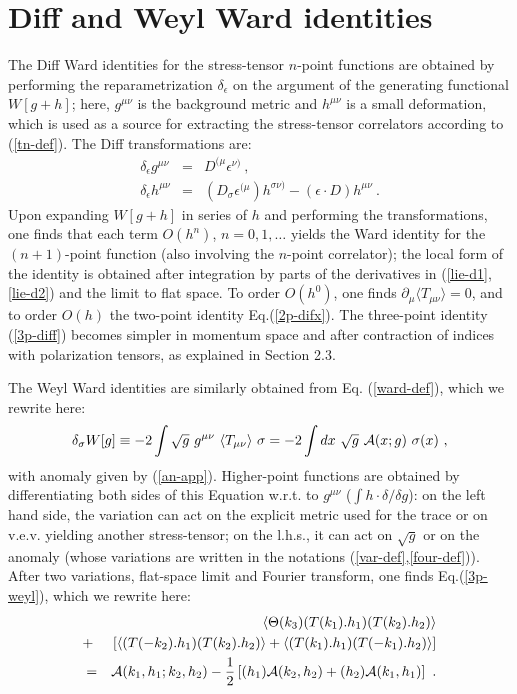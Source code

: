 \documentclass[11pt]{article}
\newcommand{\beq}{\begin{equation}}
\newcommand{\eeq}{\end{equation}}
\newcommand{\bea}{\begin{eqnarray}}
\newcommand{\eea}{\end{eqnarray}}
\def\s{\sigma}
\def\d{\delta}
\def\eps{\epsilon}
\def\T{\Theta}
\def\half{{1 \over 2}}
\def\nl{\nonumber\\}
\def\bh{\!\!\!\!\!\!}
\def\bra{\langle}
\def\ket{\rangle}
\def\A{{\cal A}}    %
\begin{document}


\section{Diff and Weyl Ward identities} 
\label{app-ward}

The Diff Ward identities for the stress-tensor $n$-point functions
are obtained by performing the reparametrization 
$\d_\eps$ on the argument of the generating functional
$W[g+h]$; here, $g^{\mu\nu}$ is the background metric and 
$h^{\mu\nu}$ is a small deformation, which is used as a source
for extracting the stress-tensor correlators according to (\ref{tn-def}).
The Diff transformations are:
\bea
\delta_\eps g^{\mu\nu} &=& D^{(\mu} \eps^{\nu)}\ ,
\label{lie-d1}\\
\delta_\eps h^{\mu\nu} &=& \left( D_\s \eps^{(\mu} \right)
h^{\s\nu)} - \left( \eps\cdot D\right) h^{\mu\nu}\ .
\label{lie-d2} 
\eea
Upon expanding $W[g+h]$ in series of $h$ and performing the
transformations, one finds that each term $O(h^n)$, $n=0,1,\dots$ yields
the Ward identity for the $(n+1)$-point function (also involving
the $n$-point correlator); the local form of the
identity is obtained after integration by parts of 
the derivatives in (\ref{lie-d1},\ref{lie-d2})
and the limit to flat space.
To order $O(h^0)$, one finds $\partial_\mu \bra T_{\mu\nu} \ket =0$,
and to order $O(h)$ the two-point identity Eq.(\ref{2p-difx}).
The three-point identity (\ref{3p-diff}) becomes simpler
in momentum space and after contraction
of indices with polarization tensors, as explained in Section 2.3.

The Weyl Ward identities are similarly obtained from 
Eq. (\ref{ward-def}), which we rewrite here:
\beq
\d_\s W[g] \equiv -2 \int \sqrt{g}\ g^{\mu\nu}\ \bra T_{\mu\nu}\ket\ \sigma 
= -2 \int dx\ \sqrt{g}\  {\cal A}(x;g)\ \sigma(x)\ ,
\label{weyl-def}\eeq
with anomaly given by (\ref{an-app}).
Higher-point functions are obtained by differentiating both sides of 
this Equation w.r.t. to $g^{\mu\nu}$
($\int h \cdot \d/\d g$): on the left hand side, the variation can act on 
the explicit metric used for the trace or on v.e.v. yielding another
stress-tensor; on the
l.h.s., it can act on $\sqrt{g}$ or on the anomaly 
(whose variations are written in the notations 
(\ref{var-def},\ref{four-def})).
After two variations, flat-space limit and Fourier transform, one finds 
Eq.(\ref{3p-weyl}), which we rewrite here:
\bea\label{3p-wey} 
&&\bh\bh \bra \T(k_3)(T(k_1).h_1)(T(k_2).h_2) \ket \nl 
&+& \left[ \bra (T(-k_2).h_1)(T(k_2).h_2) \ket + 
                     \bra (T(k_1).h_1)(T(-k_1).h_2) \ket \right] \nl 
&= & \A (k_1,h_1;k_2,h_2) - \half \left[ 
(h_1) \A (k_2,h_2) + (h_2) \A (k_1,h_1) \right] \ .
\eea 
\end{document}
